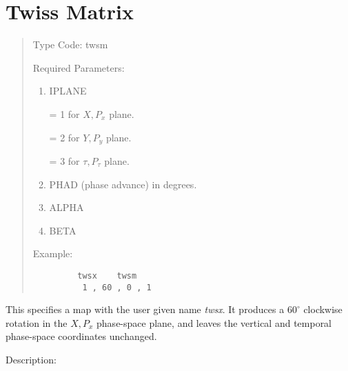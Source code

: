 \section{Twiss Matrix}
\begin{quotation}
\noindent Type Code:  twsm
\vspace{5mm}

\noindent Required Parameters:
\begin{enumerate}
      \item  IPLANE

             = 1 for $X,P_x$  plane.

             = 2 for $Y,P_y$  plane.

             = 3 for $\tau,P_\tau$  plane.
      \item  PHAD (phase advance) in degrees.
      \item  ALPHA
      \item  BETA
\end{enumerate}

\vspace{5mm}
\noindent     Example:
\begin{verbatim}
         twsx    twsm
          1 , 60 , 0 , 1
\end{verbatim}
\end{quotation}
This specifies a map with the user given name {\em twsx}.  It produces a $60^\circ$ clockwise rotation in the $X,P_x$  phase-space plane, and leaves the
vertical and temporal phase-space coordinates unchanged.

\vspace{5mm}
     Description:
\vspace{2mm}

